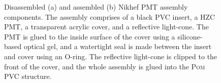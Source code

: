 \begin{figure} %
    \centering
    \quad
    \caption[Disassembled and assembled Nikhef PMT housing components]
    {Disassembled (a) and assembled (b) Nikhef PMT assembly components. The assembly comprises of
        a black PVC insert, a HZC PMT, a transparent acrylic cover, and a reflective light-cone.
        The PMT is glued to the inside surface of the cover using a silicone-based optical gel,
        and a watertight seal is made between the insert and cover using an O-ring. The reflective
        light-cone is clipped to the front of the cover, and the whole assembly is glued into the
        \textsc{Pom} PVC structure.}
    \label{fig:nikhef_pmt_assembly}
\end{figure}

